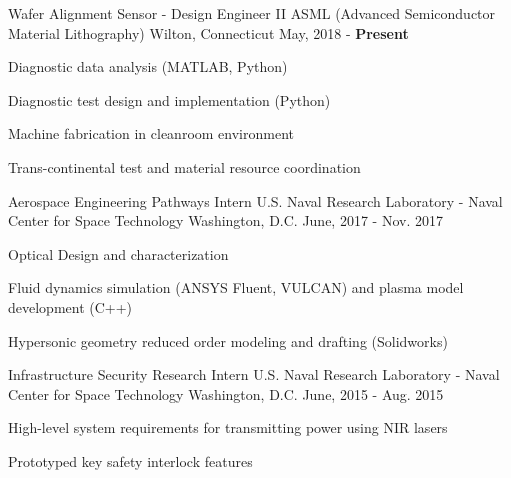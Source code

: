 

\begin{cventries}

  \cventry
    {Wafer Alignment Sensor - Design Engineer II} %
    {ASML (Advanced Semiconductor Material Lithography)} %
    {Wilton, Connecticut} %
    {May, 2018 - \textbf{Present}} %
    {
      \begin{cvitems} %
        \item {Diagnostic data analysis (MATLAB, Python)}
        \item {Diagnostic test design and implementation (Python)}
        \item {Machine fabrication in cleanroom environment}
        \item {Trans-continental test and material resource coordination}
      \end{cvitems}
    }

  \cventry
    {Aerospace Engineering Pathways Intern} %
    {U.S. Naval Research Laboratory - Naval Center for Space Technology} %
    {Washington, D.C.} %
    {June, 2017 - Nov. 2017} %
    {
      \begin{cvitems} %
        \item {Optical Design and characterization}
        \item {Fluid dynamics simulation (ANSYS Fluent, VULCAN) and plasma model development (C++)}
        \item {Hypersonic geometry reduced order modeling and drafting (Solidworks)}
      \end{cvitems}
    }

  \cventry
    {Infrastructure Security Research Intern} %
    {U.S. Naval Research Laboratory - Naval Center for Space Technology} %
    {Washington, D.C.} %
    {June, 2015 - Aug. 2015} %
    {
      \begin{cvitems} %
        \item {High-level system requirements for transmitting power using NIR lasers}
        \item {Prototyped key safety interlock features}
      \end{cvitems}
    }
\end{cventries}
